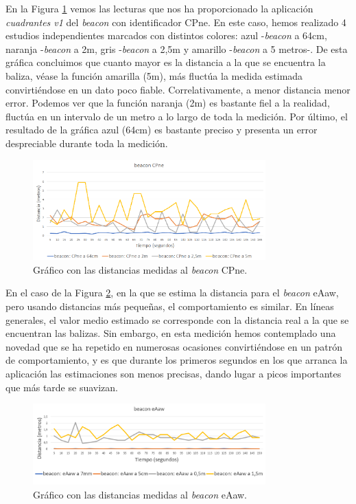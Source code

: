 En la Figura \ref{fig:dist_CPne} vemos las lecturas que nos ha proporcionado la aplicación \textit{cuadrantes v1} del \textit{beacon} con identificador CPne. En este caso, hemos realizado 4 estudios independientes marcados con distintos colores: azul -\textit{beacon} a 64cm, naranja -\textit{beacon} a 2m, gris -\textit{beacon} a 2,5m y amarillo -\textit{beacon} a 5 metros-. De esta gráfica concluimos que cuanto mayor es la distancia a la que se encuentra la baliza, véase la función amarilla (5m), más fluctúa la medida estimada convirtiéndose en un dato poco fiable. Correlativamente, a menor distancia menor error. Podemos ver que la función naranja (2m) es bastante fiel a la realidad, fluctúa en un intervalo de un metro a lo largo de toda la medición. Por último, el resultado de la gráfica azul (64cm) es bastante preciso y presenta un error despreciable durante toda la medición.

\begin{figure}[t]
	\centering
	\includegraphics[width=0.8\textwidth]{Imagenes/Descripciondeltrabajo/dist_CPne}
	\caption{Gráfico con las distancias medidas al \textit{beacon} CPne. }
	\label{fig:dist_CPne}
\end{figure}

En el caso de la Figura \ref{fig:dist_eAaw}, en la que se estima la distancia para el \textit{beacon} eAaw, pero usando distancias más pequeñas, el comportamiento es similar. En líneas generales, el valor medio estimado se corresponde con la distancia real a la que se encuentran las balizas. Sin embargo, en esta medición hemos contemplado una novedad que se ha repetido en numerosas ocasiones convirtiéndose en un patrón de comportamiento, y es que durante los primeros segundos en los que arranca la aplicación las estimaciones son menos precisas, dando lugar a picos importantes que más tarde se suavizan. 
\begin{figure}[t]
	\centering
	\includegraphics[width=0.8\textwidth]{Imagenes/Descripciondeltrabajo/dist_eAaw}
	\caption{Gráfico con las distancias medidas al \textit{beacon} eAaw. }
	\label{fig:dist_eAaw}
\end{figure}

